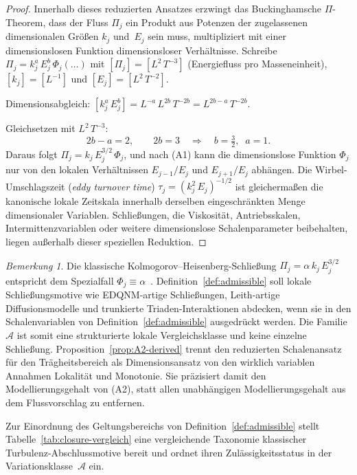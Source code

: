 \documentclass[12pt,a4paper]{article}
\theoremstyle{definition}
\theoremstyle{plain}
\theoremstyle{remark}
\newtheorem{remark}[definition]{Bemerkung}
\begin{document}
\begin{proof}
Innerhalb dieses reduzierten Ansatzes erzwingt das Buckinghamsche
$\Pi$-Theorem, dass der Fluss $\Pi_j$ ein Produkt aus Potenzen der
zugelassenen dimensionalen Größen $k_j$ und~$E_j$ sein muss, multipliziert
mit einer dimensionslosen Funktion dimensionsloser Verhältnisse. Schreibe
$\Pi_j = k_j^{a}\,E_j^{b}\,\Phi_j(\ldots)$ mit
$[\Pi_j] = [L^2\,T^{-3}]$ (Energiefluss pro Masseneinheit),
$[k_j] = [L^{-1}]$ und $[E_j] = [L^2\,T^{-2}]$.

Dimensionsabgleich: $[k_j^a\,E_j^b] = L^{-a}\,L^{2b}\,T^{-2b} = L^{2b-a}\,T^{-2b}$.

Gleichsetzen mit $L^2\,T^{-3}$:
\[
2b - a = 2, \qquad 2b = 3 \quad\Longrightarrow\quad b = \tfrac{3}{2},\;\; a = 1.
\]
Daraus folgt $\Pi_j = k_j\,E_j^{3/2}\,\Phi_j$, und nach (A1) kann die
dimensionslose Funktion $\Phi_j$ nur von den lokalen Verhältnissen
$E_{j-1}/E_j$ und $E_{j+1}/E_j$ abhängen. Die Wirbel-Umschlagszeit
(\emph{eddy turnover time})
$\tau_j = (k_j^2\,E_j)^{-1/2}$ ist gleichermaßen die kanonische lokale
Zeitskala innerhalb derselben eingeschränkten Menge dimensionaler
Variablen. Schließungen, die Viskosität, Antriebsskalen,
Intermittenzvariablen oder weitere dimensionslose Schalenparameter
beibehalten, liegen außerhalb dieser speziellen Reduktion.
\end{proof}

\begin{remark}
Die klassische Kolmogorov--Heisenberg-Schließung $\Pi_j = \alpha\,k_j\,E_j^{3/2}$
entspricht dem Spezialfall $\Phi_j \equiv \alpha$~\cite{MY75}. Definition~\ref{def:admissible}
soll lokale Schließungsmotive wie EDQNM-artige Schließungen,
Leith-artige Diffusionsmodelle und trunkierte Triaden-Interaktionen abdecken,
wenn sie in den Schalenvariablen von Definition~\ref{def:admissible} ausgedrückt werden.
Die Familie $\mathscr{A}$ ist somit eine strukturierte lokale Vergleichsklasse
und keine einzelne Schließung.
Proposition~\ref{prop:A2-derived} trennt den reduzierten
Schalenansatz für den Trägheitsbereich als Dimensionsansatz von den
wirklich variablen Annahmen Lokalität und
Monotonie. Sie präzisiert damit den Modellierungsgehalt von (A2), statt
allen unabhängigen Modellierungsgehalt aus dem Flussvorschlag zu entfernen.
\end{remark}

Zur Einordnung des Geltungsbereichs von Definition~\ref{def:admissible} stellt Tabelle~\ref{tab:closure-vergleich} eine vergleichende Taxonomie klassischer Turbulenz-Abschlussmotive bereit und ordnet ihren Zulässigkeitsstatus in der Variationsklasse~$\mathscr{A}$ ein.
\end{document}
